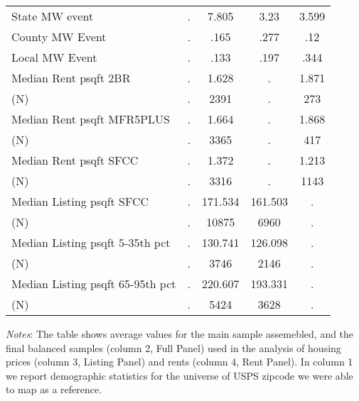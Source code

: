\begin{table}[htb!]
{\begin{tabular}{l*{4}{c}}
State MW event&           .&       7.805&        3.23&       3.599\\
County MW Event&           .&        .165&        .277&         .12\\
Local MW Event&           .&        .133&        .197&        .344\\
Median Rent psqft 2BR&           .&       1.628&           .&       1.871\\
(N)         &           .&        2391&           .&         273\\
Median Rent psqft MFR5PLUS&           .&       1.664&           .&       1.868\\
(N)         &           .&        3365&           .&         417\\
Median Rent psqft SFCC&           .&       1.372&           .&       1.213\\
(N)         &           .&        3316&           .&        1143\\
Median Listing psqft SFCC&           .&     171.534&     161.503&           .\\
(N)         &           .&       10875&        6960&           .\\
Median Listing psqft 5-35th pct&           .&     130.741&     126.098&           .\\
(N)         &           .&        3746&        2146&           .\\
Median Listing psqft 65-95th pct&           .&     220.607&     193.331&           .\\
(N)         &           .&        5424&        3628&           .\\
\hline\hline
\end{tabular}}
    \begin{minipage}{.95\textwidth} \footnotesize
		\vspace{3mm} 
		\textit{Notes}: The table shows average values for the main sample assemebled, and the final balanced samples (column 2, Full Panel) used in the analysis of housing prices (column 3, Listing Panel) and rents (column 4, Rent Panel). In column 1 we report demographic statistics for the universe of USPS zipcode we were able to map as a reference. 
	\end{minipage}
\end{table}
    
\clearpage    